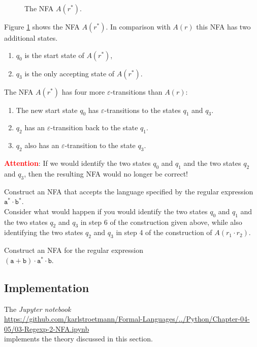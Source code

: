 \begin{enumerate}
      \begin{figure}[!ht]
        \centering
      \caption{The \textsc{NFA} $A(r^*)$.}
      \label{fig:aStar.eps}
      \end{figure}
      Figure \ref{fig:aStar.eps} shows the \textsc{NFA} $A(r^*)$.
      In comparison with $A(r)$ this \textsc{NFA} has two additional states.
      \begin{enumerate}
      \item $q_0$ is the start state of $A(r^*)$,
      \item $q_3$ is the only accepting state of $A(r^*)$.
      \end{enumerate}
      The \textsc{NFA} $A(r^*)$ has four more $\varepsilon$-transitions than $A(r)$: 
      \begin{enumerate}
      \item The new start state  $q_0$ has $\varepsilon$-transitions to the states
            $q_1$ and $q_3$.
      \item $q_2$ has an $\varepsilon$-transition back to the state $q_1$.
      \item $q_2$ also has an $\varepsilon$-transition to the state $q_3$.
      \end{enumerate}
      \textbf{\textcolor{red}{Attention}}:  If we would identify the two states 
      $q_0$ and $q_1$ and the two states $q_2$ and $q_3$, then the resulting \textsc{NFA} would no longer be
      correct!
\end{enumerate}

\exerciseEng
Construct an \textsc{NFA} that accepts the language specified by the regular expression
\\[0.2cm]
\hspace*{1.3cm}
$\texttt{a}^* \cdot \texttt{b}^*$.
\\[0.2cm]
Consider what would happen if you would identify the two states 
$q_0$ and $q_1$ and the two states $q_2$ and $q_3$ in step 6 of the construction given above, while also
identifying the two states $q_2$ and $q_3$ in step 4 of the construction of $A(r_1 \cdot r_2)$.
\eox

\exerciseEng
Construct an \textsc{NFA} for the regular expression
\\[0.2cm]
\hspace*{1.3cm}
$(\texttt{a} + \texttt{b}) \cdot \texttt{a}^* \cdot \texttt{b}$.  
\eox

\subsection{Implementation}
The \textsl{Jupyter notebook} 
\\[0.2cm]
\hspace*{0.0cm}
\href{https://github.com/karlstroetmann/Formal-Languages/blob/master/Python/Chapter-04-05/03-Regexp-2-NFA.ipynb}{https://github.com/karlstroetmann/Formal-Languages/../Python/Chapter-04-05/03-Regexp-2-NFA.ipynb} 
\\[0.2cm]
implements the theory discussed in this section.



